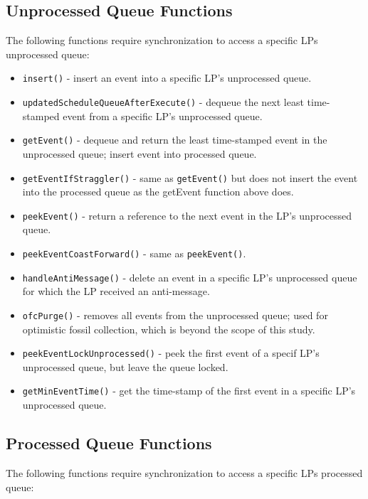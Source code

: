 \documentclass[11pt]{book}
\begin{document}
\subsection{Unprocessed Queue Functions}

The following functions require synchronization to access a specific LPs
unprocessed queue:

\begin{itemize}
  \item\texttt{insert()} - insert an event into a specific LP's unprocessed queue.
  \item\texttt{updatedScheduleQueueAfterExecute()} - dequeue the next least time-stamped
    event from a specific LP's unprocessed queue.
  \item\texttt{getEvent()} - dequeue and return the least time-stamped event in the
    unprocessed queue; insert event into processed queue.
  \item\texttt{getEventIfStraggler()} - same as \texttt{getEvent()} but does not insert
    the event into the processed queue as the getEvent function above does.
  \item\texttt{peekEvent()} - return a reference to the next event in the LP's unprocessed
    queue.
  \item\texttt{peekEventCoastForward()} - same as \texttt{peekEvent()}.
  \item\texttt{handleAntiMessage()} - delete an event in a specific LP's unprocessed queue
    for which the LP received an anti-message.
  \item\texttt{ofcPurge()} - removes all events from the unprocessed queue; used for
    optimistic fossil collection, which is beyond the scope of this study.
  \item\texttt{peekEventLockUnprocessed()} - peek the first event of a specif LP's
    unprocessed queue, but leave the queue locked.
  \item\texttt{getMinEventTime()} - get the time-stamp of the first event in a specific
    LP's unprocessed queue.
\end{itemize}

\subsection{Processed Queue Functions}

The following functions require synchronization to access a specific LPs
processed queue:
\end{document}
